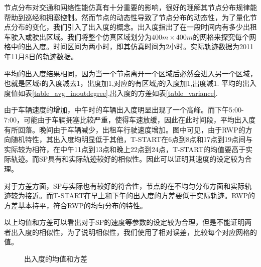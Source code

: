 节点分布对交通和网络性能仿真有十分重要的影响，很好的理解其节点分布规律能帮助到巡经和拥塞控制。然而节点的动态性导致了节点分布的动态性，为了量化节点分布的变化，我们引入了出入度的概念。出入度指出了在一段时间内有多少出租车驶入或驶出区域。我们将整个仿真区域划分为$400m \times 400m$的网格来探究每个网格中的出入度。时间区间为两小时，即其仿真时间为2小时。实际轨迹数据为2011年11月8日的轨迹数据。

平均的出入度结果相同，因为当一个节点离开一个区域后必然会进入另一个区域，也就是区域$i$的入度减去1，出度加1,对应的有区域$j$的入度加1,出度减$1$. 平均的出入度值如表\ref{table_avg_inoutdegree},出入度的方差如表\ref{table_variance}.

由于车辆速度的增加，中午时的车辆出入度明显出现了一个高峰。而下午5:00-7:00，可能由于车辆拥塞比较严重，使得车速放缓，因此在此时间段，平均出入度有所回落。晚间由于车辆减少，出租车行驶速度增加。图中可见，由于RWP的方向随机特性，其出入度均明显低于其他，T-START在6点到8点和17点到19点间与实际较为相符，在中午11点到13点和晚上22点到24点，T-START的均值要高于实际轨迹。而SP具有和实际轨迹较好的相似性。因此可以证明其速度的设定较为合理。

对于方差方面，SP与实际也有较好的符合性，节点的在不均匀分布方面和实际轨迹较为接近。而T-START在早上和下午的出入度的方差要低于实际轨迹。RWP的方差基本持平，符合RWP的均匀分布的特性。

以上均值和方差可以看出对于SP的速度等参数的设定较为合理，但是不能证明两者出入度的相似性，为了说明相似性，我们使用了相对误差，比较每个对应网格的值。


\begin{figure}[!h]
\centering
{}
\caption{出入度的均值和方差}\label{figure_avg}
\end{figure}


